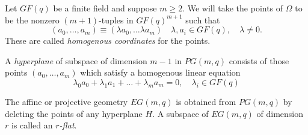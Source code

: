 \documentclass[12pt,twoside]{reedthesis}
\theoremstyle{definition}
\begin{document}
Let $GF(q)$ be a finite field and suppose $m \geq 2$. We will take the points of $\Omega$ to be the nonzero $(m+1)$-tuples in $GF(q)^{m+1}$ such that
\begin{equation*}
(a_0, \ldots, a_m) \equiv (\lambda a_0, \ldots \lambda a_m) \quad \lambda, a_i \in GF(q), \quad \lambda \neq 0.
\end{equation*}
These are called \textit{homogenous coordinates} for the points. 

A \textit{hyperplane} of subspace of dimension $m-1$ in $PG(m,q)$ consists of those points $(a_0, \ldots , a_m)$ which satisfy a homogenous linear equation 
\begin{equation*}
\lambda_0 a_0 + \lambda_1 a_1 + \ldots + \lambda_m a_m = 0, \quad \lambda_i \in GF(q)
\end{equation*}

The affine or projective geometry $EG(m,q)$ is obtained from $PG(m,q)$ by deleting the points of any hyperplane $H$. A subspace of $EG(m,q)$ of dimension $r$ is called an \textit{$r$-flat}. 

  \backmatter %

    \nocite{*}


  
 

\printindex
\end{document}
